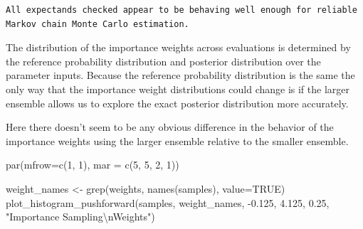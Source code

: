 \documentclass[
  letterpaper,
  DIV=11,
  numbers=noendperiod]{scrartcl}
\newenvironment{Shaded}{\begin{snugshade}}{\end{snugshade}}
\newcommand{\AttributeTok}[1]{\textcolor[rgb]{0.40,0.45,0.13}{#1}}
\newcommand{\ConstantTok}[1]{\textcolor[rgb]{0.56,0.35,0.01}{#1}}
\newcommand{\DecValTok}[1]{\textcolor[rgb]{0.68,0.00,0.00}{#1}}
\newcommand{\FloatTok}[1]{\textcolor[rgb]{0.68,0.00,0.00}{#1}}
\newcommand{\FunctionTok}[1]{\textcolor[rgb]{0.28,0.35,0.67}{#1}}
\newcommand{\NormalTok}[1]{\textcolor[rgb]{0.00,0.23,0.31}{#1}}
\newcommand{\OtherTok}[1]{\textcolor[rgb]{0.00,0.23,0.31}{#1}}
\newcommand{\SpecialCharTok}[1]{\textcolor[rgb]{0.37,0.37,0.37}{#1}}
\newcommand{\StringTok}[1]{\textcolor[rgb]{0.13,0.47,0.30}{#1}}
\begin{document}
\begin{Shaded}
\end{Shaded}

\begin{verbatim}
All expectands checked appear to be behaving well enough for reliable
Markov chain Monte Carlo estimation.
\end{verbatim}

The distribution of the importance weights across evaluations is
determined by the reference probability distribution and posterior
distribution over the parameter inputs. Because the reference
probability distribution is the same the only way that the importance
weight distributions could change is if the larger ensemble allows us to
explore the exact posterior distribution more accurately.

Here there doesn't seem to be any obvious difference in the behavior of
the importance weights using the larger ensemble relative to the smaller
ensemble.

\begin{Shaded}
\begin{Highlighting}[]
\FunctionTok{par}\NormalTok{(}\AttributeTok{mfrow=}\FunctionTok{c}\NormalTok{(}\DecValTok{1}\NormalTok{, }\DecValTok{1}\NormalTok{), }\AttributeTok{mar =} \FunctionTok{c}\NormalTok{(}\DecValTok{5}\NormalTok{, }\DecValTok{5}\NormalTok{, }\DecValTok{2}\NormalTok{, }\DecValTok{1}\NormalTok{))}

\NormalTok{weight\_names }\OtherTok{\textless{}{-}} \FunctionTok{grep}\NormalTok{(}\StringTok{\textquotesingle{}weights\textquotesingle{}}\NormalTok{, }\FunctionTok{names}\NormalTok{(samples), }\AttributeTok{value=}\ConstantTok{TRUE}\NormalTok{)}
\FunctionTok{plot\_histogram\_pushforward}\NormalTok{(samples, weight\_names, }\SpecialCharTok{{-}}\FloatTok{0.125}\NormalTok{, }\FloatTok{4.125}\NormalTok{, }\FloatTok{0.25}\NormalTok{,}
                           \StringTok{"Importance Sampling}\SpecialCharTok{\textbackslash{}n}\StringTok{Weights"}\NormalTok{)}
\end{Highlighting}
\end{Shaded}
\end{document}
